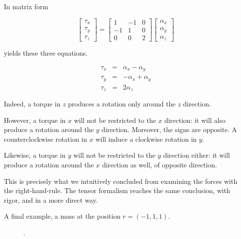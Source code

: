 In matrix form 

\begin{equation}
\left[\begin{array}{c}
\tau_x\\
\tau_y\\
\tau_z
\end{array}\right] = \left[\begin{array}{ccc}
1 & -1 & 0 \\
-1 & 1 & 0 \\
0 & 0 & 2
\end{array}\right] 
\left[\begin{array}{c}
\alpha_x\\
\alpha_y\\
\alpha_z
\end{array}\right] 
\end{equation}

yields these three equations. 

\begin{eqnarray}
\tau_x &=& \alpha_x - \alpha_y  \\
\tau_y &=& -\alpha_x + \alpha_y  \\
\tau_z &=& 2\alpha_z
\end{eqnarray}


Indeed, a torque in $z$ produces a rotation only around the $z$ direction. 

However, a torque in $x$ will not be restricted to the $x$ direction: it will also produce a rotation around the $y$ direction. Moreover, the signs are opposite. A counterclockwise rotation in $x$ will induce a clockwise rotation in $y$. 

Likewise, a torque in $y$ will not be restricted to the $y$ direction either: it will produce a rotation around the $x$ direction as well, of opposite direction. 

This is precisely what we intuitively concluded from examining the
forces with the right-hand-rule. The tensor formalism reaches the same
conclusion, with rigor, and in a more direct way.

A final example, a mass at the position $r=(-1,1,1)$. 

\begin{figure}
  \begin{center}
  \end{center}
  \caption[]{.}
  \label{fig:tensor19}
\end{figure}

